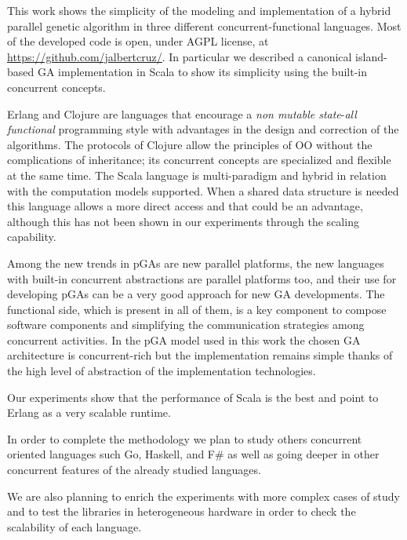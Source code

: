 This work shows the simplicity of the modeling and implementation of a hybrid parallel genetic algorithm in three different concurrent-functional languages. Most of the developed code is open, under AGPL license, at \url{https://github.com/jalbertcruz/}. In particular we described a canonical island-based GA implementation in Scala to show its simplicity using the built-in concurrent concepts.

Erlang and Clojure are languages that encourage a \emph{non mutable state}-\emph{all functional} programming style with advantages in the design and correction of the algorithms. The protocols of Clojure allow the principles of OO without the complications of inheritance; its concurrent concepts  are specialized and flexible at the same time. The Scala language is multi-paradigm and hybrid in relation with the computation models supported. When a shared data structure is needed this language allows a more direct access and that could be an advantage, although this has not been shown in our experiments through the scaling capability.

Among the new trends in pGAs are new parallel platforms, the new languages with built-in concurrent abstractions are parallel platforms too, and their use for developing pGAs can be a very good approach for new GA developments. The functional side, which is present in all of them, is a key component to compose software components and simplifying the communication strategies among concurrent activities. In the pGA model used in this work the chosen GA architecture is concurrent-rich but the implementation remains simple thanks of the high level of abstraction of the implementation technologies.

Our experiments show that the performance of Scala is the best and point to Erlang as a very scalable runtime.

In order to complete the methodology we plan to study others concurrent oriented languages such Go, Haskell, and F\# as well as going deeper in other concurrent features of the already studied languages.

We are also planning to enrich the experiments with more complex cases of study and to test the libraries in heterogeneous hardware in order to check the scalability of each language.

